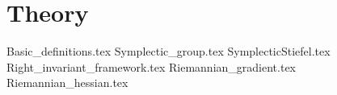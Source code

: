 \section{Theory}


{Basic_definitions.tex}
{Symplectic_group.tex}
{SymplecticStiefel.tex}
{Right_invariant_framework.tex}
{Riemannian_gradient.tex}
{Riemannian_hessian.tex}
